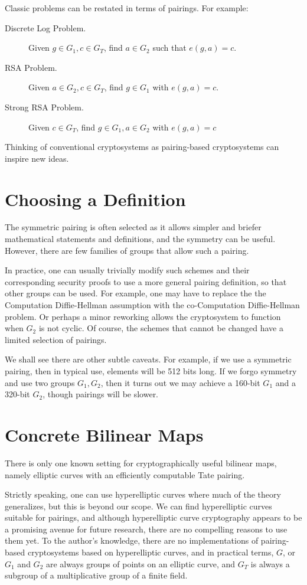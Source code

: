 Classic problems can be restated in terms of
pairings. For example:

\begin{description}
\item[Discrete Log Problem.]
Given $g \in G_1, c \in G_T$, find $a \in G_2$ such that $e(g,a) = c$.
\item[RSA Problem.]
Given $a \in G_2, c \in G_T$, find $g \in G_1$ with
$e(g,a) = c$.
\item[Strong RSA Problem.]
Given $c \in G_T$, find $g \in G_1, a\in G_2$ with
$e(g,a) = c$
\end{description}

Thinking of conventional cryptosystems as pairing-based cryptosystems
can inspire new ideas.

\section{Choosing a Definition}

The symmetric pairing is often selected
as it allows simpler and briefer mathematical statements and definitions,
and the symmetry can be useful.
However, there are few families of groups that allow such a pairing.

In practice, one can usually trivially modify such
schemes and their corresponding
security proofs to use a more general pairing definition,
so that other groups can be used. For example, one may have to replace the
the Computation Diffie-Hellman assumption with
the co-Computation Diffie-Hellman problem. Or perhaps
a minor reworking allows the cryptosystem to function when $G_2$
is not cyclic.
Of course, the schemes that cannot be changed have a limited selection
of pairings.

We shall see there are other subtle caveats.
For example, if we use a symmetric pairing, then in typical use,
elements will be 512 bits long.
If we forgo symmetry and use two groups $G_1, G_2$,
then it turns out we may achieve a 160-bit $G_1$ and a 320-bit $G_2$,
though pairings will be slower.

\section{Concrete Bilinear Maps}

There is only one known setting for cryptographically useful bilinear maps,
namely elliptic curves with an efficiently computable
Tate pairing.

Strictly speaking, one can use hyperelliptic
curves where much of the theory generalizes, but this is beyond
our scope.
We can find hyperelliptic
curves~\cite{galbraith,rubinsilverberg,freemanhyper} suitable for
pairings, and although hyperelliptic curve cryptography appears to
be a promising avenue for future research, there are no compelling reasons
to use them yet.
To the author's knowledge, there are no implementations
of pairing-based cryptosystems based on hyperelliptic curves,
and in practical terms, $G$, or $G_1$ and $G_2$ are always
groups of points on
an elliptic curve, and $G_T$ is always a subgroup of a multiplicative group
of a finite field.

